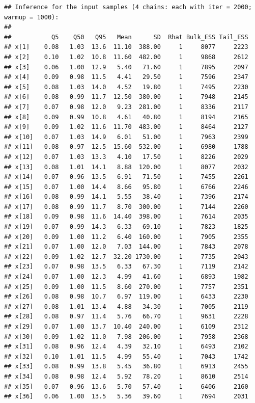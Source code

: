 \documentclass[american,]{article}
\begin{document}
\begin{verbatim}
## Inference for the input samples (4 chains: each with iter = 2000; warmup = 1000):
## 
##           Q5    Q50   Q95   Mean      SD  Rhat Bulk_ESS Tail_ESS
## x[1]    0.08   1.03  13.6  11.10  388.00     1     8077     2223
## x[2]    0.10   1.02  10.8  11.60  482.00     1     9868     2612
## x[3]    0.06   1.00  12.9   5.40   71.60     1     7895     2097
## x[4]    0.09   0.98  11.5   4.41   29.50     1     7596     2347
## x[5]    0.08   1.03  14.0   4.52   19.80     1     7495     2230
## x[6]    0.08   0.99  11.7  12.50  380.00     1     7948     2145
## x[7]    0.07   0.98  12.0   9.23  281.00     1     8336     2117
## x[8]    0.09   0.99  10.8   4.61   40.80     1     8194     2165
## x[9]    0.09   1.02  11.6  11.70  483.00     1     8464     2127
## x[10]   0.07   1.03  14.9   6.01   51.00     1     7963     2399
## x[11]   0.08   0.97  12.5  15.60  532.00     1     6980     1788
## x[12]   0.07   1.03  13.3   4.10   17.50     1     8226     2029
## x[13]   0.08   1.01  14.1   8.88  120.00     1     8077     2032
## x[14]   0.07   0.96  13.5   6.91   71.50     1     7455     2261
## x[15]   0.07   1.00  14.4   8.66   95.80     1     6766     2246
## x[16]   0.08   0.99  14.1   5.55   38.40     1     7396     2174
## x[17]   0.08   0.99  11.7   8.70  300.00     1     7144     2260
## x[18]   0.09   0.98  11.6  14.40  398.00     1     7614     2035
## x[19]   0.07   0.99  14.3   6.33   69.10     1     7823     1825
## x[20]   0.09   1.00  11.2   6.40  160.00     1     7905     2355
## x[21]   0.07   1.00  12.0   7.03  144.00     1     7843     2078
## x[22]   0.09   1.02  12.7  32.20 1730.00     1     7735     2043
## x[23]   0.07   0.98  13.5   6.33   67.30     1     7119     2142
## x[24]   0.07   1.00  12.3   4.99   41.60     1     6893     1982
## x[25]   0.09   1.00  11.5   8.60  270.00     1     7757     2351
## x[26]   0.08   0.98  10.7   6.97  119.00     1     6433     2230
## x[27]   0.08   1.01  13.4   4.88   34.30     1     7005     2119
## x[28]   0.08   0.97  11.4   5.76   66.70     1     9631     2228
## x[29]   0.07   1.00  13.7  10.40  240.00     1     6109     2312
## x[30]   0.09   1.02  11.0   7.98  206.00     1     7958     2368
## x[31]   0.08   0.96  12.4   4.39   32.10     1     6493     2102
## x[32]   0.10   1.01  11.5   4.99   55.40     1     7043     1742
## x[33]   0.08   0.99  13.8   5.45   36.80     1     6913     2455
## x[34]   0.08   0.98  12.4   5.92   78.20     1     8610     2514
## x[35]   0.07   0.96  13.6   5.70   57.40     1     6406     2160
## x[36]   0.06   1.00  13.5   5.36   39.60     1     7694     2031

\end{verbatim}
\end{document}
